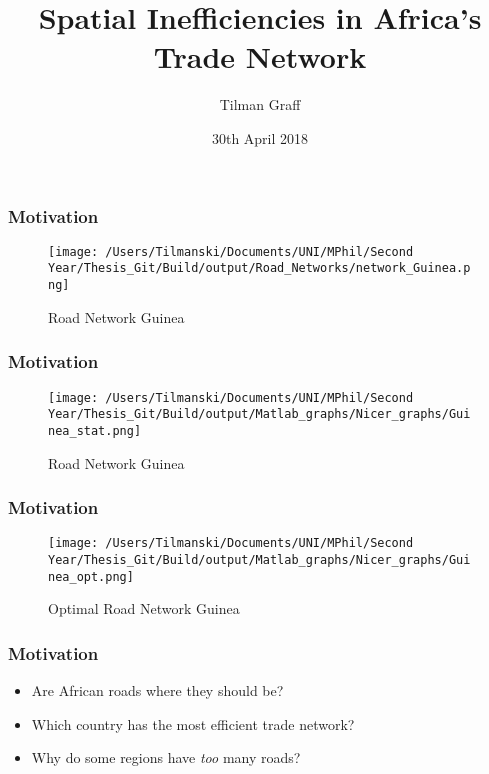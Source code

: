 \documentclass[]{beamer}   	%
\title{Spatial Inefficiencies in Africa's Trade Network}
\author{Tilman Graff}
\institute{University of Oxford}
\date{30th April 2018}
\begin{document}
\begin{frame}
  \titlepage
\end{frame}

\begin{frame}
  \frametitle{Motivation}
  \begin{figure}
    \texttt{[image: /Users/Tilmanski/Documents/UNI/MPhil/Second Year/Thesis\_Git/Build/output/Road\_Networks/network\_Guinea.png]}
    \caption{Road Network Guinea}

  \end{figure}
\end{frame}

\begin{frame}
  \frametitle{Motivation}
\begin{figure}
    \texttt{[image: /Users/Tilmanski/Documents/UNI/MPhil/Second Year/Thesis\_Git/Build/output/Matlab\_graphs/Nicer\_graphs/Guinea\_stat.png]}
    \caption{Road Network Guinea}

  \end{figure}
\end{frame}

\begin{frame}
  \frametitle{Motivation}
\begin{figure}
    \texttt{[image: /Users/Tilmanski/Documents/UNI/MPhil/Second Year/Thesis\_Git/Build/output/Matlab\_graphs/Nicer\_graphs/Guinea\_opt.png]}
    \caption{Optimal Road Network Guinea}

  \end{figure}
\end{frame}

\begin{frame}
  \frametitle{Motivation}
  \begin{itemize}
    \item Are African roads where they should be?
    \item Which country has the most efficient trade network?
    \item Why do some regions have \emph{too} many roads?
  \end{itemize}
\end{frame}

\end{document}
